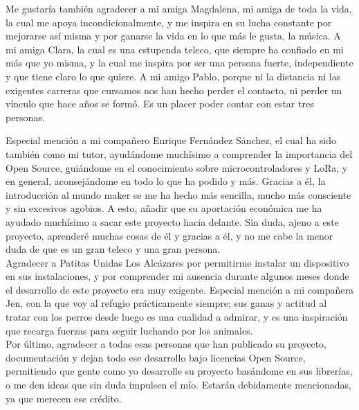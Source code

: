 \documentclass[12pt]{article}
\begin{document}
	\noindent Me gustaría también agradecer a mi amiga Magdalena, mi amiga de toda la vida, la cual me apoya incondicionalmente, y me inspira en su lucha constante por mejorarse así misma y por ganarse la vida en lo que más le gusta, la música. A mi amiga Clara, la cual es una estupenda teleco, que siempre ha confiado en mi más que yo misma, y la cual me inspira por ser una persona fuerte, independiente y que tiene claro lo que quiere. A mi amigo Pablo, porque ni la distancia ni las exigentes carreras que cursamos nos han hecho perder el contacto, ni perder un vínculo que hace años se formó. Es un placer poder contar con estar tres personas.\\  
	
	\pagebreak
	\thispagestyle{plain}
	
	\noindent Especial mención a mi compañero Enrique Fernández Sánchez, el cual ha sido también como mi tutor, ayudándome muchísimo a comprender la importancia del Open Source, guiándome en el conocimiento sobre microcontroladores y LoRa, y en general, aconsejándome en todo lo que ha podido y más. Gracias a él, la introducción al mundo maker se me ha hecho más sencilla, mucho más consciente y sin excesivos agobios. A esto, añadir que su aportación económica me ha ayudado muchísimo a sacar este proyecto hacia delante. Sin duda, ajeno a este proyecto, aprenderé muchas cosas de él y gracias a él, y no me cabe la menor duda de que es un gran teleco y una gran persona.\\
	
	\noindent Agradecer a Patitas Unidas Los Alcázares por permitirme instalar un dispositivo en sus instalaciones, y por comprender mi ausencia durante algunos meses donde el desarrollo de este proyecto era muy exigente. Especial mención a mi compañera Jen, con la que voy al refugio prácticamente siempre; sus ganas y actitud al tratar con los perros desde luego es una cualidad a admirar, y es una inspiración que recarga fuerzas para seguir luchando por los animales.\\
	
	\noindent Por último, agradecer a todas esas personas que han publicado su proyecto,  documentación y dejan todo ese desarrollo bajo licencias Open Source, permitiendo que gente como yo desarrolle su proyecto basándome en sus librerías, o me den ideas que sin duda impulsen el mío. Estarán debidamente mencionadas, ya que merecen ese crédito.\\
	
	\pagebreak
	
\end{document}
